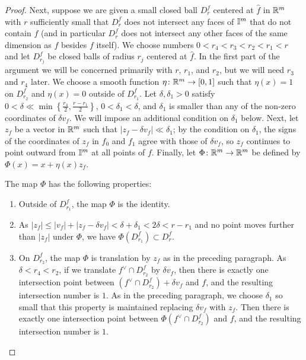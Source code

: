 \begin{proof}
	Next, suppose we are given a small closed ball $D^f_r$ centered at $\hat f$ in $\mathbb{R}^m$ with $r$ sufficiently small that $D^f_r$ does not intersect any faces of $\mathbb{I}^m$ that do not contain $f$ (and in particular $D^f_r$ does not intersect any other faces of the same dimension as $f$ besides $f$ itself).
	We choose numbers $0<r_4 < r_3 < r_2<r_1<r$ and let $D^f_{r_j}$ be closed balls of radius $r_j$ centered at $\hat f$.
	In the first part of the argument we will be concerned primarily with $r$, $r_1$, and $r_2$, but we will need $r_3$ and $r_4$ later.
	We choose a smooth function $\eta \colon \mathbb{R}^m \to [0,1]$ such that $\eta(x) = 1$ on $D^f_{r_2}$ and $\eta(x) = 0$ outside of $D^f_{r_1}$.
	Let $\delta, \delta_1 > 0$ satisfy $0 < \delta \ll \min\left\{\frac{r_4}{2}, \frac{r-r_1}{2}\right\}$, $0 < \delta_1 < \delta$, and $\delta_1$ is smaller than any of the non-zero coordinates of $\delta v_f$.
	We will impose an additional condition on $\delta_1$ below.
	Next, let $z_f$ be a vector in $\mathbb{R}^m$ such that $|z_f-\delta v_f|\ll \delta_1$; by the condition on $\delta_1$, the signs of the coordinates of $z_f$ in $f_0$ and $f_1$ agree with those of $\delta v_f$, so $z_f$ continues to point outward from $\mathbb{I}^m$ at all points of $f$.
	Finally, let $\Phi \colon \mathbb{R}^m \to \mathbb{R}^m$ be defined by $\Phi(x) = x+ \eta(x) z_f$.

	The map $\Phi$ has the following properties:
	\begin{enumerate}
		\item Outside of $D^f_{r_1}$, the map $\Phi$ is the identity.

		\item As $|z_f|\leq |v_f| + |z_f-\delta v_f| < \delta+\delta_1 < 2 \delta < r-r_1$ and no point moves further than $|z_f|$ under $\Phi$, we have $\Phi(D^f_{r_1})\subset D^f_r$.

		\item On $D_{r_2}^f$, the map $\Phi$ is translation by $z_f$ as in the preceding paragraph.
		As $\delta < r_4 < r_2$, if we translate $f^\vee \cap D_{r_2}^f$ by $\delta v_f$, then there is exactly one intersection point between $(f^\vee \cap D_{r_2}^f) + \delta v_f$ and $f$, and the resulting intersection number is $1$.
		As in the preceding paragraph, we choose $\delta_1$ so small that this property is maintained replacing $\delta v_f$ with $z_f$.
		Then there is exactly one intersection point between $\Phi(f^\vee \cap D_{r_2}^f)$ and $f$, and the resulting intersection number is $1$.

		\begin{comment}	\item As $|z_f| < 2\delta < r_4$, the interior of $D_{r_4}^f$ (and hence all $D_{r_j}^f$) contains both $\hat f$ and $\hat f-z_f$, the latter of which is in the interior of $\interval^m$ as $z_f$ points outward from $\interval^m$, in the $f_0$ and $f_1$ directions.
		\end{comment}


\end{enumerate}
\end{proof}
